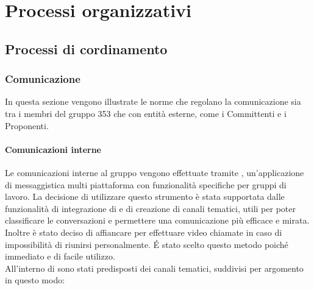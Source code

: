 \documentclass[NormeDiProgetto.tex]{subfiles}
\begin{document}
	\chapter{Processi organizzativi}

	\section{Processi di cordinamento}
	
	\subsection{Comunicazione}
	In questa sezione vengono illustrate le norme che regolano la comunicazione sia tra i membri del gruppo 353 che con entità esterne, come i Committenti e i Proponenti.
	\subsubsection{Comunicazioni interne}
	Le comunicazioni interne al gruppo vengono effettuate tramite , un'applicazione di messaggistica multi piattaforma con funzionalità specifiche per gruppi di lavoro. La decisione di utilizzare questo strumento è stata supportata dalle funzionalità di integrazione di  e di creazione di canali tematici, utili per poter classificare le conversazioni e permettere una comunicazione più efficace e mirata.\\
	Inoltre è stato deciso di affiancare  per effettuare video chiamate in caso di impossibilità di riunirsi personalmente. \'{E} stato scelto questo metodo poiché immediato e di facile utilizzo.\\
	All'interno di  sono stati predisposti dei canali tematici, suddivisi per argomento in questo modo:
\end{document}
